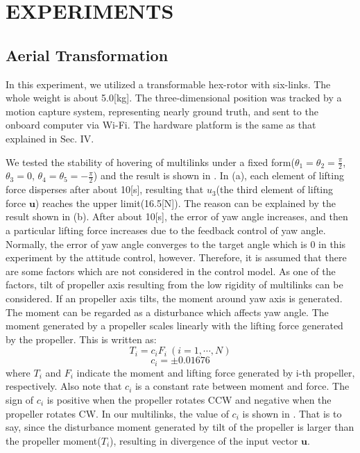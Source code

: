 \section{EXPERIMENTS}
\subsection{Aerial Transformation}
In this experiment, we utilized a transformable hex-rotor with six-links. The whole weight is about 5.0[kg]. The three-dimensional position was tracked by a motion capture system, representing nearly ground truth, and sent to the onboard computer via Wi-Fi. The hardware platform is the same as that explained in Sec. IV. 
\par
We tested the stability of hovering of multilinks under a fixed form($\theta_1=\theta_2=\frac{\pi}{2}$, $\theta_3=0$, $\theta_4=\theta_5=-\frac{\pi}{2}$) and the result is shown in . In (a), each element of lifting force disperses after about 10[s], resulting that $u_3$(the third element of lifting force $\bm{u}$) reaches the upper limit(16.5[N]). The reason can be explained by the result shown in (b). After about 10[s], the error of yaw angle increases, and then a particular lifting force increases due to the feedback control of yaw angle. Normally, the error of yaw angle converges to the target angle  which is $0$ in this experiment  by the attitude control, however. Therefore, it is assumed that there are some factors which are not considered in the control model. As one of the factors, tilt of propeller axis resulting from the low rigidity of multilinks can be considered. If an propeller axis tilts, the moment around yaw axis is generated. The moment can be regarded as a disturbance which affects yaw angle. The moment generated by a propeller scales linearly with the lifting force generated by the propeller. This is written as:
\begin{equation}
  T_i=c_iF_i \ (i=1,\cdots,N)
\end{equation}
\begin{equation}
  c_i=\pm 0.01676
  \label{eq:coef_c}
\end{equation}
where $T_i$ and $F_i$ indicate the moment and lifting force generated by i-th propeller, respectively. Also note that $c_i$ is a constant rate between moment and force. The sign of $c_i$ is positive when the propeller rotates CCW and negative when the propeller rotates CW. In our multilinks, the value of $c_i$ is shown in . That is to say, since the disturbance moment generated by tilt of the propeller is larger than the propeller moment($T_i$), resulting in divergence of the input vector $\bm{u}$. 
